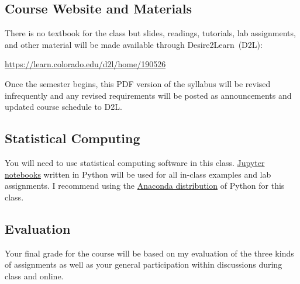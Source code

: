 \documentclass[10pt]{memoir}
\begin{document}
\subsection{Course Website and Materials}
There is no textbook for the class but slides, readings, tutorials, lab assignments, and other material will be made available through \mbox{Desire2Learn}~(D2L):
\vspace{-8pt}
    \begin{center}
    \Large{\href{https://learn.colorado.edu/d2l/home/190526}{https://learn.colorado.edu/d2l/home/190526}}
    \end{center}
\vspace{-8pt}
Once the semester begins, this PDF version of the syllabus will be revised infrequently and any revised requirements will be posted as announcements and updated course schedule to D2L.

\subsection{Statistical Computing}
You will need to use statistical computing software in this class. \href{http://jupyter.org/}{Jupyter notebooks} written in Python will be used for all in-class examples and lab assignments. I recommend using the \href{https://www.continuum.io/why-anaconda}{Anaconda distribution} of Python for this class.

\subsection{Evaluation} 
Your final grade for the course will be based on my evaluation of the three kinds of assignments as well as your general participation within discussions during class and online. 
\end{document}
